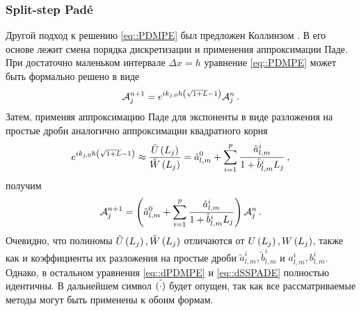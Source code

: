 \documentclass[../document.tex]{subfiles}
\begin{document}
			\subsubsection{Split-step Pad\'e\label{sec::root_ssp}}
				\par Другой подход к решению \eqref{eq::PDMPE} был предложен Коллинзом \cite{collins}. В его основе лежит смена порядка дискретизации и применения аппроксимации Паде. При достаточно маленьком интервале $\Delta x=h$ уравнение \eqref{eq::PDMPE} может быть формально решено в виде
				\begin{equation}
					\mathcal{A}_j^{n+1}=e^{ik_{j,0}h\left(\sqrt{1+L}-1\right)}\mathcal{A}_j^n\,.
				\end{equation}
				Затем, применяя аппроксимацию Паде для экспоненты  в виде разложения на простые дроби аналогично аппроксимации квадратного корня
				\begin{equation}\label{eq::SSPADE}
					e^{ik_{j,0}h\left(\sqrt{1+L}-1\right)}\approx\frac{\tilde{U}\left(L_j\right)}{\tilde{W}\left(L_j\right)}=\tilde{a}_{l,m}^0+\sum\limits_{i=1}^p\frac{\tilde{a}_{l,m}^i}{1+\tilde{b}_{l,m}^iL_j}\,,
				\end{equation}
				получим
				\begin{equation}\label{eq::dSSPADE}
					\mathcal{A}_j^{n+1}=\left(\tilde{a}_{l,m}^0+\sum\limits_{i=1}^p\frac{\tilde{a}_{l,m}^i}{1+\tilde{b}_{l,m}^iL_j}\right)\mathcal{A}_j^n\,.
				\end{equation}
                Очевидно, что полиномы $\tilde{U}\left(L_j\right),\tilde{W}\left(L_j\right)$ отличаются от $U\left(L_j\right),W\left(L_j\right)$, также как и коэффициенты их разложения на простые дроби $\tilde{a}_{l,m}^i, \tilde{b}_{l,m}^i$ и $a_{l,m}^i,b_{l,m}^i$. Однако, в остальном уравнения \eqref{eq::dPDMPE} и \eqref{eq::dSSPADE} полностью идентичны. В дальнейшем символ $\tilde{\left(\cdot\right)}$ будет опущен, так как все рассматриваемые методы могут быть применены к обоим формам. 
\end{document}
